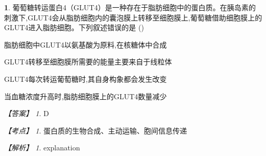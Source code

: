 \documentclass[UTF8, 10pt, a4paper, oneside]{ctexart}
\theoremstyle{definition}
\newtheorem{exercise}{}
\theoremstyle{remark}
\newtheorem*{answer}{【答案】}
\newtheorem*{point}{【考点】}      %
\newtheorem*{explanation}{【解析】}     %
\theoremstyle{plain}
\begin{document}
\begin{exercise}
葡萄糖转运蛋白4（GLUT4）是一种存在于脂肪细胞中的蛋白质。在胰岛素的刺激下,GLUT4会从脂肪细胞内的囊泡膜上转移至细胞膜上,葡萄糖借助细胞膜上的GLUT4进入脂肪细胞。下列叙述错误的是 \quad(\quad)
    \begin{adjustwidth}{2em}{}
            \begin{asparaenum}[A. ]
                \item 脂肪细胞中GLUT4以氨基酸为原料,在核糖体中合成
                \item GLUT4转移至细胞膜所需要的能量主要来自于线粒体
                \item GLUT4每次转运葡萄糖时,其自身构象都会发生改变
                \item 当血糖浓度升高时,脂肪细胞膜上的GLUT4数量减少
            \end{asparaenum}
    \end{adjustwidth}
    \begin{answer}
        D
    \end{answer}
    \begin{point}
        蛋白质的生物合成、主动运输、胞间信息传递
    \end{point}
    \begin{explanation}
        explanation
    \end{explanation}
\end{exercise}
\end{document}
